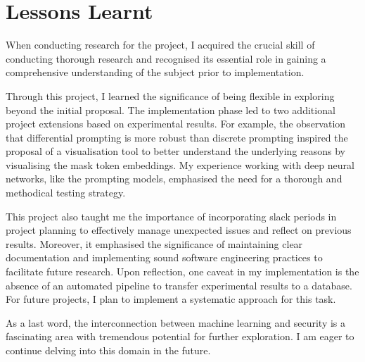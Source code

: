 \section{Lessons Learnt}
When conducting research for the project, I acquired the crucial skill of conducting thorough research and recognised its essential role in gaining a comprehensive understanding of the subject prior to implementation. 

Through this project, I learned the significance of being flexible in exploring beyond the initial proposal. The implementation phase led to two additional project extensions based on experimental results. For example, the observation that differential prompting is more robust than discrete prompting inspired the proposal of a visualisation tool to better understand the underlying reasons by visualising the mask token embeddings. My experience working with deep neural networks, like the prompting models, emphasised the need for a thorough and methodical testing strategy.

This project also taught me the importance of incorporating slack periods in project planning to effectively manage unexpected issues and reflect on previous results. Moreover, it emphasised the significance of maintaining clear documentation and implementing sound software engineering practices to facilitate future research. Upon reflection, one caveat in my implementation is the absence of an automated pipeline to transfer experimental results to a database. For future projects, I plan to implement a systematic approach for this task.

As a last word, the interconnection between machine learning and security is a fascinating area with tremendous potential for further exploration. I am eager to continue delving into this domain in the future.